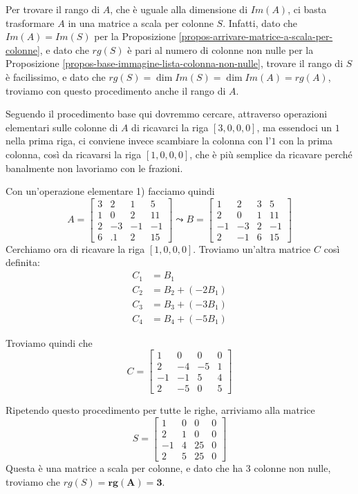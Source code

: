 \documentclass[11pt, a4paper, titlepage, oneside]{scrbook}
\begin{document}
Per trovare il rango di $A$, che è uguale alla dimensione di $Im(A)$, ci basta trasformare $A$ in una matrice a scala per colonne $S$. Infatti, dato che $Im(A) = Im(S)$ per la Proposizione \ref{propos-arrivare-matrice-a-scala-per-colonne}, e dato che $rg(S)$ è pari al numero di colonne non nulle per la Proposizione \ref{propos-base-immagine-lista-colonna-non-nulle}, trovare il rango di $S$ è facilissimo, e dato che $rg(S) = \dim Im(S) = \dim Im(A) = rg(A)$, troviamo con questo procedimento anche il rango di $A$.

Seguendo il procedimento base qui dovremmo cercare, attraverso operazioni elementari sulle colonne di $A$ di ricavarci la riga $[3,0,0,0]$, ma essendoci un $1$ nella prima riga, ci conviene invece scambiare la colonna con l'$1$ con la prima colonna, così da ricavarsi la riga $[1,0,0,0]$, che è più semplice da ricavare perché banalmente non lavoriamo con le frazioni.

Con un'operazione elementare 1) facciamo quindi
\[ A = 
\begin{bmatrix}
    3 & 2 & 1 & 5 \\
    1 & 0 & 2 & 11 \\
    2 & -3 & -1 & -1 \\
    6 & .1 & 2 & 15
\end{bmatrix}
\leadsto
B = \begin{bmatrix}
    1 & 2 & 3 & 5 \\
    2 & 0 & 1 & 11 \\
    -1 & -3 & 2 & -1 \\
    2 & -1 & 6 & 15
\end{bmatrix}
\]
Cerchiamo ora di ricavare la riga $[1,0,0,0]$. Troviamo un'altra matrice $C$ così definita:
\begin{align*}
C_1 &= B_1  \\
C_2 &= B_2 + (-2 B_1) \\
C_3 &= B_3 + (-3 B_1) \\
C_4 &= B_4 + (-5 B_1)
\end{align*}

Troviamo quindi che 
\[
C = \begin{bmatrix}
    1 & 0 & 0 & 0 \\
    2 & -4 & -5 & 1 \\
    -1 & -1 & 5 & 4 \\
    2 & -5 & 0 & 5
\end{bmatrix}
\]

Ripetendo questo procedimento per tutte le righe, arriviamo alla matrice 
\[ S =
\begin{bmatrix}
    1 & 0 & 0 & 0 \\
    2 & 1 & 0 & 0 \\
    -1 & 4 & 25 & 0 \\
    2 & 5 & 25 & 0 
\end{bmatrix}
\]
Questa è una matrice a scala per colonne, e dato che ha 3 colonne non nulle, troviamo che $rg(S) = \bm{rg(A) = 3}$.
\end{document}

